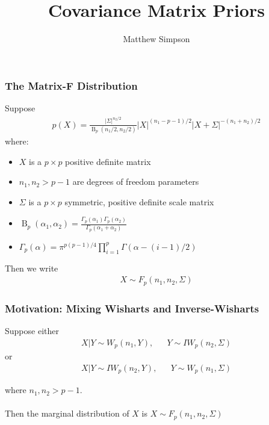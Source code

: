 \documentclass[xcolor=dvipsnames]{beamer}
\title[Cov Mat Priors]{Covariance Matrix Priors}
\author[Matt Simpson]{Matthew Simpson}
\date{}
\institute[]{Departments of Statistics and Economics, Iowa State University}
\DeclareMathOperator{\B}{B}
\begin{document}
\begin{frame}
\titlepage
\end{frame}

\begin{frame}
\frametitle{The Matrix-F Distribution}

Suppose
\begin{align*}
  p(X) = \frac{\left|\Sigma\right|^{n_2/2}}{\B_p(n_1/2,n_2/2)}|X|^{(n_1 - p - 1)/2}|X + \Sigma|^{-(n_1 + n_2)/2}
\end{align*}
where: 
\begin{itemize}
\item $X$ is a $p\times p$ positive definite matrix
\item $n_1,n_2 > p - 1$ are degrees of freedom parameters 
\item $\Sigma$ is a $p\times p$ symmetric, positive definite scale matrix
\item $\B_p(\alpha_1, \alpha_2) = \frac{\Gamma_p(\alpha_1)\Gamma_p(\alpha_2)}{\Gamma_p(\alpha_1 + \alpha_2)}$
\item $\Gamma_p(\alpha) = \pi^{p(p-1)/4}\prod_{i=1}^p\Gamma(\alpha - (i-1)/2) $
\end{itemize}
Then we write 
\begin{align*}
X\sim F_p(n_1, n_2, \Sigma)
\end{align*}

\end{frame}

\begin{frame}
\frametitle{Motivation: Mixing Wisharts and Inverse-Wisharts}

Suppose either 
\begin{align*}
X|Y \sim W_p(n_1,Y), && Y\sim IW_p(n_2,\Sigma)
\end{align*}
or 
\begin{align*}
X|Y \sim IW_p(n_2,Y), && Y\sim W_p(n_1,\Sigma)
\end{align*}

where $n_1,n_2>p-1$.\\~\\ 
\pause 
Then the marginal distribution of $X$ is $X\sim F_p(n_1,n_2,\Sigma)$
\end{frame}
\end{document}
